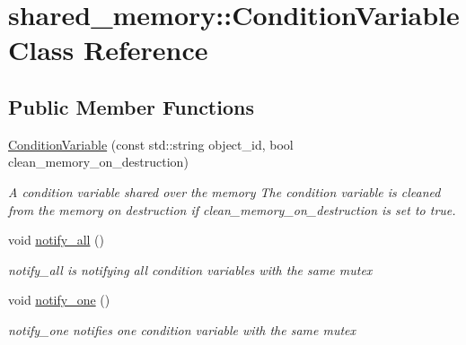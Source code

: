 \hypertarget{classshared__memory_1_1ConditionVariable}{}\section{shared\+\_\+memory\+:\+:Condition\+Variable Class Reference}
\label{classshared__memory_1_1ConditionVariable}
\subsection*{Public Member Functions}
\begin{DoxyCompactItemize}
\item 
\mbox{\label{classshared__memory_1_1ConditionVariable_ae4b6accfbe98b2e23f9e20789cea46f7}} 
\hyperlink{classshared__memory_1_1ConditionVariable_ae4b6accfbe98b2e23f9e20789cea46f7}{Condition\+Variable} (const std\+::string object\+\_\+id, bool clean\+\_\+memory\+\_\+on\+\_\+destruction)
\begin{DoxyCompactList}\small\item\em A condition variable shared over the memory The condition variable is cleaned from the memory on destruction if clean\+\_\+memory\+\_\+on\+\_\+destruction is set to true. \end{DoxyCompactList}\item 
\mbox{\label{classshared__memory_1_1ConditionVariable_abc70cd1401f40e23ca4a6afb33f28bb5}} 
void \hyperlink{classshared__memory_1_1ConditionVariable_abc70cd1401f40e23ca4a6afb33f28bb5}{notify\+\_\+all} ()
\begin{DoxyCompactList}\small\item\em notify\+\_\+all is notifying all condition variables with the same mutex \end{DoxyCompactList}\item 
\mbox{\label{classshared__memory_1_1ConditionVariable_a8953b054a1074ab5ef0a9f9b35f58a42}} 
void \hyperlink{classshared__memory_1_1ConditionVariable_a8953b054a1074ab5ef0a9f9b35f58a42}{notify\+\_\+one} ()
\begin{DoxyCompactList}\small\item\em notify\+\_\+one notifies one condition variable with the same mutex \end{DoxyCompactList}\item 

\end{DoxyCompactItemize}
